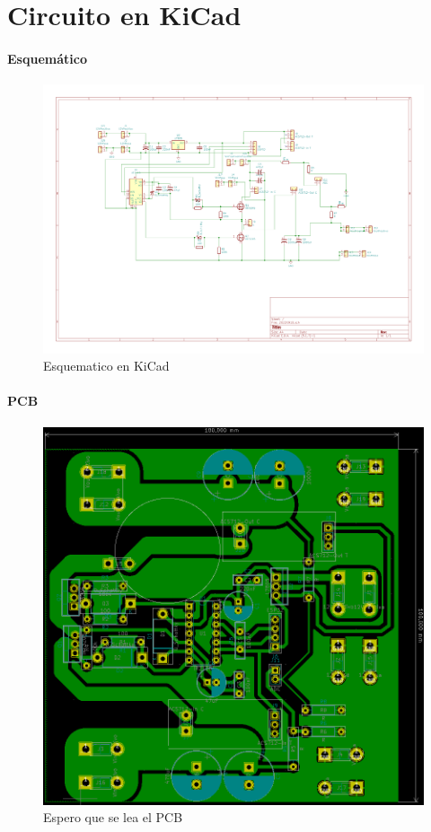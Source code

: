 \chapter{Circuito en KiCad}
\label{Circuito en KiCad}
\subsubsection{Esquemático}
\begin{figure}[H]
\begin{center}
\includegraphics[width=1\linewidth,frame]{imagenes/kicadsquematics.png}
\caption{Esquematico en KiCad}
\label{fig:esquem_KiCad}
\end{center}
\end{figure}
\subsubsection{PCB}
\begin{figure}[H]
\begin{center}
\includegraphics[width=1\linewidth,frame]{imagenes/pcbapendice.png}
\caption{Espero que se lea el PCB}
\label{fig:PCD_en_AP}
\end{center}
\end{figure}